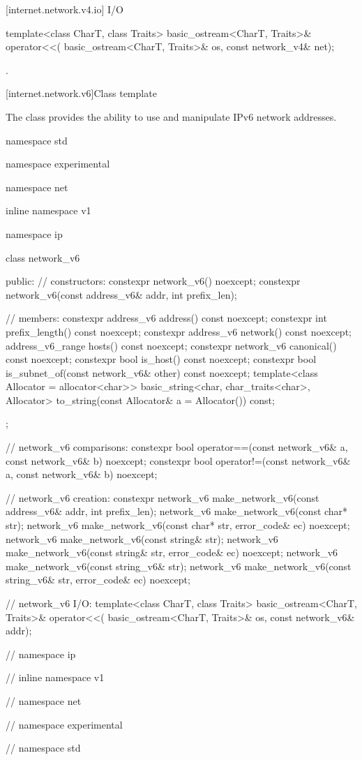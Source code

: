 [internet.network.v4.io]{ I/O}

\begin{itemdecl}
template<class CharT, class Traits>
  basic_ostream<CharT, Traits>& operator<<(
    basic_ostream<CharT, Traits>& os, const network_v4& net);
\end{itemdecl}

\begin{itemdescr}
\pnum
\returns {}.
\end{itemdescr}




[internet.network.v6]{Class template }

\pnum
The class  provides the ability to use and manipulate IPv6 network addresses.

\begin{codeblock}
namespace std {
namespace experimental {
namespace net {
inline namespace v1 {
namespace ip {

  class network_v6
  {
  public:
    // constructors:
    constexpr network_v6() noexcept;
    constexpr network_v6(const address_v6& addr, int prefix_len);

    // members:
    constexpr address_v6 address() const noexcept;
    constexpr int prefix_length() const noexcept;
    constexpr address_v6 network() const noexcept;
    address_v6_range hosts() const noexcept;
    constexpr network_v6 canonical() const noexcept;
    constexpr bool is_host() const noexcept;
    constexpr bool is_subnet_of(const network_v6& other) const noexcept;
    template<class Allocator = allocator<char>>
      basic_string<char, char_traits<char>, Allocator>
        to_string(const Allocator& a = Allocator()) const;
  };

  // network_v6 comparisons:
  constexpr bool operator==(const network_v6& a, const network_v6& b) noexcept;
  constexpr bool operator!=(const network_v6& a, const network_v6& b) noexcept;

  // network_v6 creation:
  constexpr network_v6 make_network_v6(const address_v6& addr, int prefix_len);
  network_v6 make_network_v6(const char* str);
  network_v6 make_network_v6(const char* str, error_code& ec) noexcept;
  network_v6 make_network_v6(const string& str);
  network_v6 make_network_v6(const string& str, error_code& ec) noexcept;
  network_v6 make_network_v6(const string_v6& str);
  network_v6 make_network_v6(const string_v6& str, error_code& ec) noexcept;

  // network_v6 I/O:
  template<class CharT, class Traits>
    basic_ostream<CharT, Traits>& operator<<(
      basic_ostream<CharT, Traits>& os, const network_v6& addr);

} // namespace ip
} // inline namespace v1
} // namespace net
} // namespace experimental
} // namespace std
\end{codeblock}


